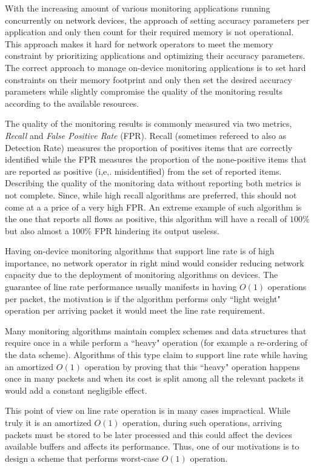 With the increasing amount of various monitoring applications running concurrently on network devices, the approach of setting accuracy parameters per application and only then count for their required memory is not operational. This approach makes it hard for network operators to meet the memory constraint by prioritizing applications and optimizing their accuracy parameters. The correct approach to manage on-device monitoring applications is to set hard constraints on their memory footprint and only then set the desired accuracy parameters while slightly compromise the quality of the monitoring results according to the available resources. 

The quality of the monitoring results is commonly measured via two metrics, \textit{Recall} and \textit{False Positive Rate} (FPR). Recall (sometimes refereed to also as Detection Rate) measures the proportion of positives items that are correctly identified while the FPR measures the proportion of the none-positive items that are reported as positive (i,e,. misidentified) from the set of reported items.  Describing the quality of the monitoring data without reporting both metrics is not complete. Since, while high recall algorithms are preferred, this should not come at a a price of a very high FPR. An extreme example of such algorithm is the one that reports all flows as positive, this algorithm will have a recall of $100\%$ but also almost a $100\%$ FPR hindering its output useless.

Having on-device monitoring algorithms that support line rate is of high importance, no network operator in right mind would consider reducing network capacity due to the deployment of monitoring algorithms on devices. The guarantee of line rate performance usually manifests in having $O(1)$ operations per packet, the motivation is if the algorithm performs only ``light weight" operation per arriving packet it would meet the line rate requirement.

Many monitoring algorithms maintain complex schemes and data structures that require once in a while perform a ``heavy" operation (for example a re-ordering of the data scheme). Algorithms of this type claim to support line rate while having an amortized $O(1)$ operation by proving that this ``heavy" operation happens once in many packets and when its cost is split among all the relevant packets it would add a constant negligible effect.

This point of view on line rate operation is in many cases impractical. While truly it is an amortized $O(1)$ operation, during such operations, arriving packets must be stored to be later processed and this could affect the devices available buffers and affects its performance. Thus, one of our motivations is to design a scheme that performs worst-case $O(1)$ operation.

